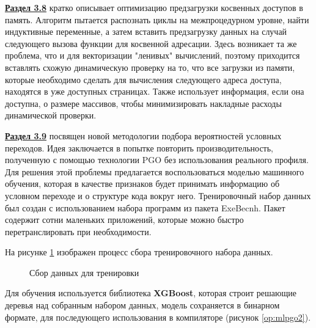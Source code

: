  \underline{\textbf{Раздел 3.8}} кратко описывает оптимизацию предзагрузки косвенных доступов в память. Алгоритм пытается распознать циклы на межпроцедурном уровне, найти индуктивные переменные, а затем вставить предзагрузку данных на случай следующего вызова функции для косвенной адресации. Здесь возникает та же проблема, что и для векторизации "ленивых"\phantom{ } вычислений, поэтому приходится вставлять схожую динамическую проверку на то, что все загрузки из памяти, которые необходимо сделать для вычисления следующего адреса доступа, находятся в уже доступных страницах. Также использует информация, если она доступна, о размере массивов, чтобы минимизировать накладные расходы динамической проверки.
 
  \underline{\textbf{Раздел 3.9}} посвящен новой методологии подбора вероятностей условных переходов. Идея заключается в попытке повторить производительность, полученную с помощью технологии PGO без использования реального профиля. Для решения этой проблемы предлагается воспользоваться моделью машинного обучения, которая в качестве признаков будет принимать информацию об условном переходе и о структуре кода вокруг него. Тренировочный набор данных был создан с использованием набора программ из пакета
  ExeBecnh. Пакет содержит сотни маленьких приложений, которые
  можно быстро перетранслировать при необходимости. 
  
  На рисунке \ref{op:mlpgo1} изображен процесс сбора тренировочного набора данных.
  \begin{figure}[htbp]
  	\centering
  	
  	\caption{Сбор данных для тренировки}
  	\label{op:mlpgo1}
  \end{figure}
  
  Для обучения используется библиотека \textbf{XGBoost}, которая строит решающие деревья над собранным набором данных, модель сохраняется в бинарном формате, для последующего использования в компиляторе (рисунок \ref{op:mlpgo2}).
  

